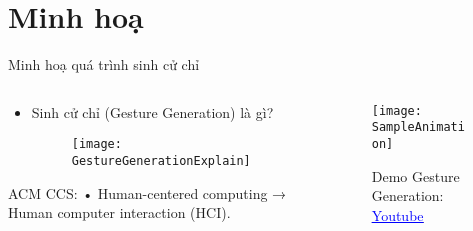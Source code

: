 \section{Minh hoạ}

\begin{frame}{Minh hoạ quá trình sinh cử chỉ}
	\vspace{10pt}
	\begin{columns}
		\begin{column}{0.7\textwidth}
			\begin{itemize}
				\item Sinh cử chỉ (Gesture Generation) là gì?
				
				\begin{figure}[h]
					\centering
					\texttt{[image: GestureGenerationExplain]}
				\end{figure}
			
			\end{itemize}
			ACM CCS: • Human-centered computing → Human computer interaction (HCI).
			
		\end{column}
		\begin{column}{0.3\textwidth} %
			\begin{figure}[h]
			\centering
			\texttt{[image: SampleAnimation]}
			
				
			{
			\small Demo Gesture Generation: \href{https://www.youtube.com/watch?v=B6nv1kQmi-Q}{\textcolor{blue}{\uline{Youtube}}}
			}
			\end{figure}
		\end{column}
	\end{columns}
\end{frame}

